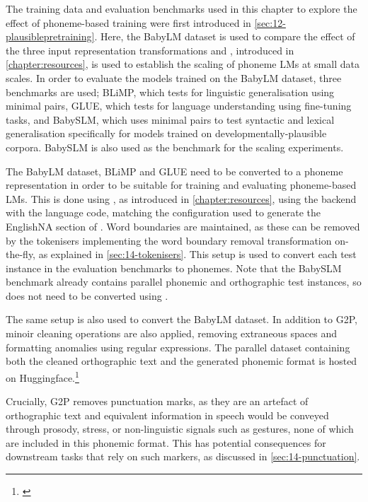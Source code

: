 The training data and evaluation benchmarks used in this chapter to explore the effect of phoneme-based training were first introduced in \cref{sec:12-plausiblepretraining}. Here, the BabyLM dataset is used to compare the effect of the three input representation transformations and \ipachildes, introduced in \cref{chapter:resources}, is used to establish the scaling of phoneme LMs at small data scales. In order to evaluate the models trained on the BabyLM dataset, three benchmarks are used; BLiMP, which tests for linguistic generalisation using minimal pairs, GLUE, which tests for language understanding using fine-tuning tasks, and BabySLM, which uses minimal pairs to test syntactic and lexical generalisation specifically for models trained on developmentally-plausible corpora. BabySLM is also used as the benchmark for the scaling experiments.

The BabyLM dataset, BLiMP and GLUE need to be converted to a phoneme representation in order to be suitable for training and evaluating phoneme-based LMs. This is done using \gpp, as introduced in \cref{chapter:resources}, using the  backend with the  language code, matching the configuration used to generate the EnglishNA section of \ipachildes. Word boundaries are maintained, as these can be removed by the tokenisers implementing the word boundary removal transformation on-the-fly, as explained in \cref{sec:14-tokenisers}. This setup is used to convert each test instance in the evaluation benchmarks to phonemes. Note that the BabySLM benchmark already contains parallel phonemic and orthographic test instances, so does not need to be converted using \gpp.

The same setup is also used to convert the BabyLM dataset. In addition to G2P, minoir cleaning operations are also applied, removing extraneous spaces and formatting anomalies using regular expressions. The parallel dataset containing both the cleaned orthographic text and the generated phonemic format is hosted on Huggingface.\footnote{\href{https://huggingface.co/datasets/phonemetransformers/IPA-BabyLM}{}}

Crucially, G2P removes punctuation marks, as they are an artefact of orthographic text and equivalent information in speech would be conveyed through prosody, stress, or non-linguistic signals such as gestures, none of which are included in this phonemic format. This has potential consequences for downstream tasks that rely on such markers, as discussed in \cref{sec:14-punctuation}.


